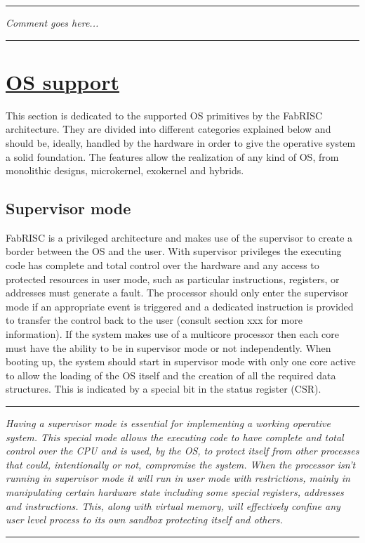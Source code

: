 \documentclass{article}
\begin{document}

        \par\noindent\rule{\textwidth}{0.4pt}
        \textit{Comment goes here...}
        \par\noindent\rule{\textwidth}{0.4pt}

    \clearpage

    \section[OS support]{\LARGE\underline{OS support}}

        This section is dedicated to the supported OS primitives by the FabRISC architecture. They are divided into different categories explained below and should be, ideally, handled by the hardware in order to give the operative system a solid foundation. The features allow the realization of any kind of OS, from monolithic designs, microkernel, exokernel and hybrids.

        \subsection{Supervisor mode}

            FabRISC is a privileged architecture and makes use of the supervisor to create a border between the OS and the user. With supervisor privileges the executing code has complete and total control over the hardware and any access to protected resources in user mode, such as particular instructions, registers, or addresses must generate a fault. The processor should only enter the supervisor mode if an appropriate event is triggered and a dedicated instruction is provided to transfer the control back to the user (consult section xxx for more information). If the system makes use of a multicore processor then each core must have the ability to be in supervisor mode or not independently. When booting up, the system should start in supervisor mode with only one core active to allow the loading of the OS itself and the creation of all the required data structures. This is indicated by a special bit in the status register (CSR).

        \par\noindent\rule{\textwidth}{0.4pt}
        \textit{Having a supervisor mode is essential for implementing a working operative system. This special mode allows the executing code to have complete and total control over the CPU and is used, by the OS, to protect itself from other processes that could, intentionally or not, compromise the system. When the processor isn't running in supervisor mode it will run in user mode with restrictions, mainly in manipulating certain hardware state including some special registers, addresses and instructions. This, along with virtual memory, will effectively confine any user level process to its own sandbox protecting itself and others.}
        \par\noindent\rule{\textwidth}{0.4pt}
\end{document}
